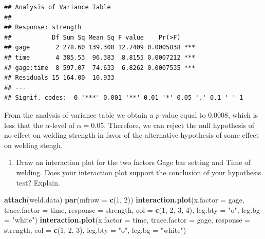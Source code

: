 \documentclass[12pt,]{article}
\newenvironment{Shaded}{\begin{snugshade}}{\end{snugshade}}
\newcommand{\KeywordTok}[1]{\textcolor[rgb]{0.13,0.29,0.53}{\textbf{#1}}}
\newcommand{\DataTypeTok}[1]{\textcolor[rgb]{0.13,0.29,0.53}{#1}}
\newcommand{\DecValTok}[1]{\textcolor[rgb]{0.00,0.00,0.81}{#1}}
\newcommand{\StringTok}[1]{\textcolor[rgb]{0.31,0.60,0.02}{#1}}
\newcommand{\NormalTok}[1]{#1}
\providecommand{\tightlist}{%
  \setlength{\itemsep}{0pt}\setlength{\parskip}{0pt}}
\begin{document}
\begin{verbatim}
## Analysis of Variance Table
## 
## Response: strength
##           Df Sum Sq Mean Sq F value    Pr(>F)    
## gage       2 278.60 139.300 12.7409 0.0005838 ***
## time       4 385.53  96.383  8.8155 0.0007212 ***
## gage:time  8 597.07  74.633  6.8262 0.0007535 ***
## Residuals 15 164.00  10.933                      
## ---
## Signif. codes:  0 '***' 0.001 '**' 0.01 '*' 0.05 '.' 0.1 ' ' 1
\end{verbatim}

From the analysis of variance table we obtain a \(p\)-value equal to
\(0.0008\), which is less that the \(\alpha\)-level of
\(\alpha = 0.05\). Therefore, we can reject the null hypothesis of no
effect on welding strength in favor of the alternative hypothesis of
some effect on welding stengh.

\begin{enumerate}
\def\labelenumi{(\alph{enumi})}
\setcounter{enumi}{1}
\tightlist
\item
  Draw an interaction plot for the two factors Gage bar setting and Time
  of welding. Does your interaction plot support the conclusion of your
  hypothesis test? Explain.
\end{enumerate}

\begin{Shaded}
\begin{Highlighting}[]
\KeywordTok{attach}\NormalTok{(weld.data)}
\KeywordTok{par}\NormalTok{(}\DataTypeTok{mfrow =} \KeywordTok{c}\NormalTok{(}\DecValTok{1}\NormalTok{, }\DecValTok{2}\NormalTok{))}
\KeywordTok{interaction.plot}\NormalTok{(}\DataTypeTok{x.factor =}\NormalTok{ gage, }\DataTypeTok{trace.factor =}\NormalTok{ time, }\DataTypeTok{response =}\NormalTok{ strength,}
\DataTypeTok{col =} \KeywordTok{c}\NormalTok{(}\DecValTok{1}\NormalTok{, }\DecValTok{2}\NormalTok{, }\DecValTok{3}\NormalTok{, }\DecValTok{4}\NormalTok{), }\DataTypeTok{leg.bty =} \StringTok{"o"}\NormalTok{, }\DataTypeTok{leg.bg =} \StringTok{"white"}\NormalTok{) }
\KeywordTok{interaction.plot}\NormalTok{(}\DataTypeTok{x.factor =}\NormalTok{ time, }\DataTypeTok{trace.factor =}\NormalTok{ gage, }\DataTypeTok{response =}\NormalTok{ strength,}
\DataTypeTok{col =} \KeywordTok{c}\NormalTok{(}\DecValTok{1}\NormalTok{, }\DecValTok{2}\NormalTok{, }\DecValTok{3}\NormalTok{), }\DataTypeTok{leg.bty =} \StringTok{"o"}\NormalTok{, }\DataTypeTok{leg.bg =} \StringTok{"white"}\NormalTok{)}
\end{Highlighting}
\end{Shaded}
\end{document}
